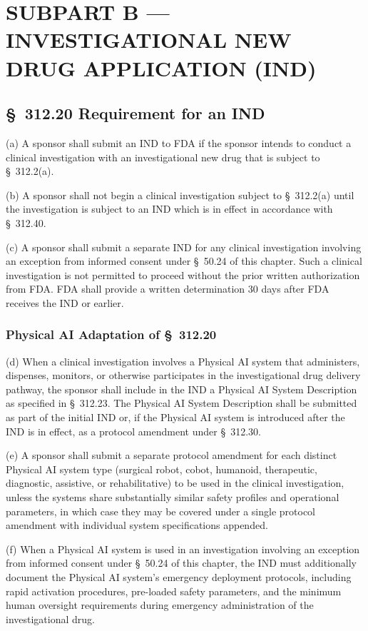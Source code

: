 
\section{SUBPART B --- INVESTIGATIONAL NEW DRUG APPLICATION (IND)}

\subsection{\S~312.20 Requirement for an IND}

(a) A sponsor shall submit an IND to FDA if the sponsor intends to conduct a clinical investigation with an investigational new drug that is subject to \S~312.2(a).

(b) A sponsor shall not begin a clinical investigation subject to \S~312.2(a) until the investigation is subject to an IND which is in effect in accordance with \S~312.40.

(c) A sponsor shall submit a separate IND for any clinical investigation involving an exception from informed consent under \S~50.24 of this chapter. Such a clinical investigation is not permitted to proceed without the prior written authorization from FDA. FDA shall provide a written determination 30 days after FDA receives the IND or earlier.

\subsubsection{Physical AI Adaptation of \S~312.20}

(d) When a clinical investigation involves a Physical AI system that administers, dispenses, monitors, or otherwise participates in the investigational drug delivery pathway, the sponsor shall include in the IND a Physical AI System Description as specified in \S~312.23. The Physical AI System Description shall be submitted as part of the initial IND or, if the Physical AI system is introduced after the IND is in effect, as a protocol amendment under \S~312.30.

(e) A sponsor shall submit a separate protocol amendment for each distinct Physical AI system type (surgical robot, cobot, humanoid, therapeutic, diagnostic, assistive, or rehabilitative) to be used in the clinical investigation, unless the systems share substantially similar safety profiles and operational parameters, in which case they may be covered under a single protocol amendment with individual system specifications appended.

(f) When a Physical AI system is used in an investigation involving an exception from informed consent under \S~50.24 of this chapter, the IND must additionally document the Physical AI system's emergency deployment protocols, including rapid activation procedures, pre-loaded safety parameters, and the minimum human oversight requirements during emergency administration of the investigational drug.

